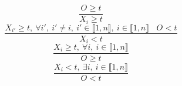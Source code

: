 $$\frac{O_{} \geq t}{X_{i} \geq t}$$ $$\frac{X_{i'} \geq t,~\forall i',~i' \neq i,~i' \in \llbracket1,n\rrbracket,~i \in \llbracket1,n\rrbracket~~~~O_{}<t}{X_{i}<t}$$ $$\frac{X_{i} \geq t,~\forall i,~i \in \llbracket1,n\rrbracket}{O_{} \geq t}$$ $$\frac{X_{i}<t,~\exists i,~i \in \llbracket1,n\rrbracket}{O_{}<t}$$ 
